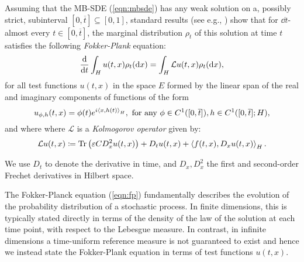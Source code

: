 Assuming that the MB-SDE (\ref{eqn:mbsde}) has any weak solution on a, possibly strict, subinterval \([0, \overline{t}] \subseteq [0, 1]\), standard results (see e.g., \citealp[][Chapter 14.2.2]{da2014stochastic}) show that for \(\dd{t}\)-almost every \(t \in [0, \overline{t}]\), the marginal distribution \(\rho_{t}\) of this solution at time \(t\) satisfies the following \textit{Fokker-Plank} equation:
\begin{equation}
  \dv{t} \int_{H} u(t, x) \rho_{t}(\dd{x}) = \int_{H} \mathcal{L} u(t, x) \rho_{t}(\dd{x}), \label{eqn:fp}
\end{equation}
for all test functions \(u(t, x)\) in the space \(E\) formed by the linear span of the real and imaginary components of functions of the form
\begin{equation}
  u_{\phi, h}(t, x) = \phi(t) e^{i \ev{x, h(t)}_{H}},  \text{ for any }\phi \in C^{1}([0, \overline{t}]), h \in C^{1}([0, \overline{t}]; H), \label{eqn:testfns}
\end{equation}
and where where \(\mathcal{L}\) is a \textit{Kolmogorov operator} given by:
\[
  \mathcal{L} u(t, x) \coloneqq  \operatorname{Tr}\qty(\varepsilon C D^{2}_{x} u(t, x)) + D_{t}u(t, x) + \ev{f(t, x), D_{x} u(t, x)}_{H}.
\]

We use \(D_{t}\) to denote the derivative in time, and \(D_{x}, D^{2}_{x}\) the first and second-order Frechet derivatives in Hilbert space. %

The Fokker-Planck equation (\ref{eqn:fp}) fundamentally describes the evolution of the probability distribution of a stochastic process. In finite dimensions, this is typically stated directly in terms of the density of the law of the solution at each time point, with respect to the Lebesgue measure. In contrast, in infinite dimensions a time-uniform reference measure is not guaranteed to exist and hence we instead state the Fokker-Plank equation in terms of test functions \(u(t, x)\).

